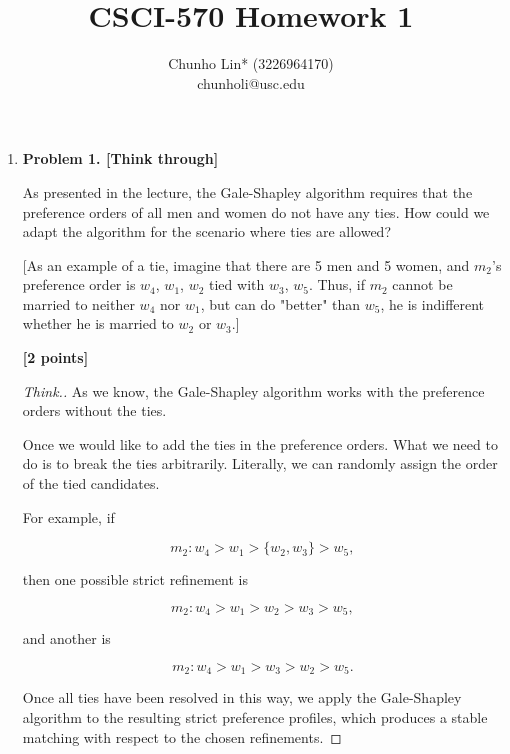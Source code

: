 \documentclass[11pt]{article}
\begin{document}
\author{Chunho Lin* (3226964170)\\chunholi@usc.edu}
\title{CSCI-570 Homework 1}
\maketitle

\medskip

\begin{enumerate}

\item \textbf{Problem 1. [Think through]}

As presented in the lecture, the Gale-Shapley algorithm requires that the preference orders of all men and women do not have any ties. How could we adapt the algorithm for the scenario where ties are allowed?

[As an example of a tie, imagine that there are 5 men and 5 women, and $m_2$'s preference order is $w_4$, $w_1$, $w_2$ tied with $w_3$, $w_5$. Thus, if $m_2$ cannot be married to neither $w_4$ nor $w_1$, but can do "better" than $w_5$, he is indifferent whether he is married to $w_2$ or $w_3$.]

\begin{flushright}
\textbf{[2 points]}
\end{flushright}

\begin{proof}[Think.]

As we know, the Gale-Shapley algorithm works with the preference orders without the ties.

Once we would like to add the ties in the preference orders. What we need to do is to break the ties arbitrarily. Literally, we can randomly assign the order of the tied candidates.

For example, if

$$
{m_2} : w_4 > w_1 > \{w_2, w_3\} > w_5,
$$

then one possible strict refinement is

$$
{m_2} : w_4 > w_1 > w_2 > w_3 > w_5,
$$

and another is

$$
{m_2} : w_4 > w_1 > w_3 > w_2 > w_5.
$$

Once all ties have been resolved in this way, we apply the Gale-Shapley algorithm to the resulting strict preference profiles, which produces a stable matching with respect to the chosen refinements.

\end{proof}


\end{enumerate}
\end{document}
